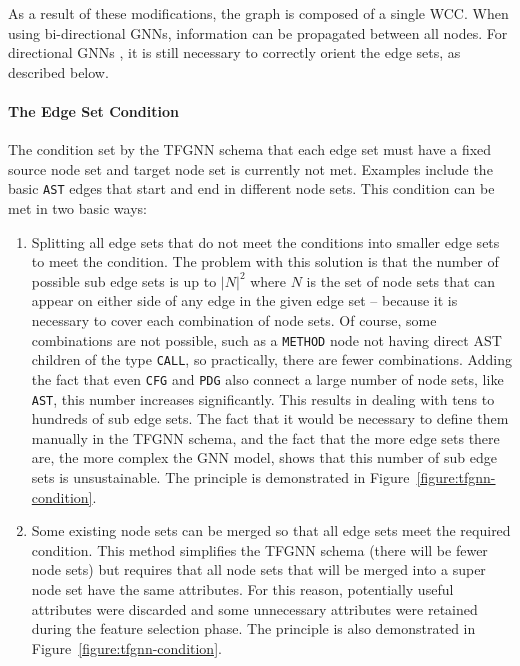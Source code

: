 As a result of these modifications, the graph is composed of a single WCC. When using bi-directional GNNs, information can be propagated between all nodes. For directional GNNs , it is still necessary to correctly orient the edge sets, as described below.

\paragraph{The Edge Set Condition}
The condition set by the TFGNN schema that each edge set must have a fixed source node set and target node set is currently not met. Examples include the basic \texttt{AST} edges that start and end in different node sets. This condition can be met in two basic ways:
\begin{enumerate}
    \item Splitting all edge sets that do not meet the conditions into smaller edge sets to meet the condition. The problem with this solution is that the number of possible sub edge sets is up to $|N|^2$ where $N$ is the set of node sets that can appear on either side of any edge in the given edge set -- because it is necessary to cover each combination of node sets. Of course, some combinations are not possible, such as a \texttt{METHOD} node not having direct AST children of the type \texttt{CALL}, so practically, there are fewer combinations. Adding the fact that even \texttt{CFG} and \texttt{PDG} also connect a large number of node sets, like \texttt{AST}, this number increases significantly. This results in dealing with tens to hundreds of sub edge sets. The fact that it would be necessary to define them manually in the TFGNN schema, and the fact that the more edge sets there are, the more complex the GNN model, shows that this number of sub edge sets is unsustainable. The principle is demonstrated in Figure~\ref{figure:tfgnn-condition}.
    \item Some existing node sets can be merged so that all edge sets meet the required condition. This method simplifies the TFGNN schema (there will be fewer node sets) but requires that all node sets that will be merged into a super node set have the same attributes. For this reason, potentially useful attributes were discarded and some unnecessary attributes were retained during the feature selection phase. The principle is also demonstrated in Figure~\ref{figure:tfgnn-condition}.
\end{enumerate}


